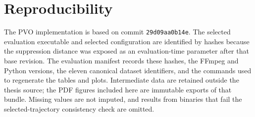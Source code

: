 \section{Reproducibility}

The PVO implementation is based on commit \texttt{29d09aa0b14e}. The selected
evaluation executable and selected configuration are identified by hashes because
the suppression distance was exposed as an evaluation-time parameter after that
base revision. The evaluation manifest records these hashes, the FFmpeg and Python versions, the
eleven canonical dataset identifiers, and the commands used to regenerate the
tables and plots. Intermediate data are retained outside the thesis source; the
PDF figures included here are immutable exports of that bundle. Missing values
are not imputed, and results from binaries that fail the selected-trajectory
consistency check are omitted.
